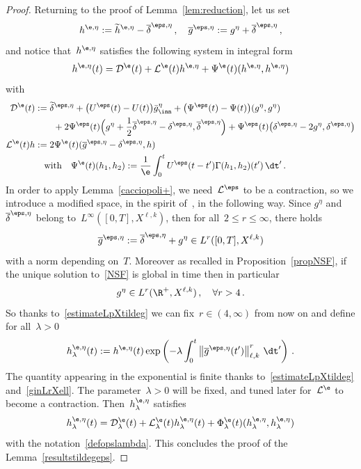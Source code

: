 \begin{proof}
Returning to the proof of Lemma~\ref{lem:reduction}, let us set
\[
h^{\e,\eta} := \widetilde h^{\e,\eta} - \overline\delta^{\eps,\eta} \,, \quad \overline g^{\eps,\eta}:= g^{ \eta} +\overline \delta^{\eps,\eta}\,,
\]
and notice that~$ h^{\e,\eta}$ satisfies the following system in integral form
\begin{equation}\label{integralformheps}
h^{\e,\eta}(t) = \mathcal{D}^{\e}(t) + \mathcal{L}^{\e}(t) h^{\e,\eta}+ \Psi^\e(t) (h^{\e,\eta}, h^{\e,\eta})
\end{equation}
with
\[
\begin{aligned}
\mathcal{D}^\e (t) & := \widetilde \delta^{\eps,\eta} + \big(U^\eps (t) - U (t)\big)\bar g^\eta_{\inn} + \big(\Psi^\eps (t) - \Psi(t) \big) (g^\eta,g^\eta)
\\
& \qquad + 2 \Psi^\eps (t) \Big({g^\eta+\frac 12 \overline\delta^{\eps,\eta}}- \delta^{\eps,\eta}, \overline\delta^{\eps,\eta}\Big) +\Psi^\eps (t)
\big(\delta^{\eps,\eta} -2g^\eta, \delta^{\eps,\eta} \big) \\
\mathcal{L}^\e (t) h& := 2\Psi ^{\e}(t) (\overline g^{\eps,\eta}- \delta^{\eps,\eta},h) \\
&\quad\text{with} \quad
\Psi ^{\e }(t) (h_1,h_2) :=\frac1\e
\int_0^t U^\eps(t-t')\Gamma (h_1,h_2) (t')\, \dt' \,.
\end{aligned}
\]
In order to apply Lemma~\ref{cacciopoli+}, we need~$\mathcal{L}^{\eps}$ to be a contraction, so we introduce a modified space, in the spirit of~\cite{cg}, in the following way. Since $ g^\eta$ and~$\overline\delta^{\eps,\eta}$ belong to~$L^\infty([0,T],X^{\ell,k})$, then for all~$2\leq r \leq\infty$, there holds
\begin{equation}\label{ginLrXellT}
\overline g^{\eps,\eta}:= \overline\delta^{\eps,\eta} +g^\eta\in L^r([0,T],X^{\ell,k})
\end{equation}
with a norm depending on~$T$. Moreover as recalled in Proposition~\ref{propNSF}, if the unique solution to~\eqref{NSF} is global in time then in particular
\begin{equation}\label{ginLrXell}
g^\eta \in L^r(\R^+,X^{\ell,k}) \,, \quad \forall r>4\,.
\end{equation}
So thanks to~\eqref{estimateLpXtildeg} we can fix~$r \in (4,\infty)$ from now on and define for all~$\lambda> 0$
\[
h^{\e,\eta}_\lambda (t):=h^{\e,\eta}(t) \exp \left(-\lambda \int_0^t \left\|\overline g^{\eps,\eta}(t')\right\|_{\ell,k}^r\, \dt'
\right)\,.
\]
The quantity appearing in the exponential is finite thanks to~\eqref{estimateLpXtildeg} and~\eqref{ginLrXell}. The parameter~$\lambda>0$ will be fixed, and tuned later for~$ \mathcal{L}^{\e}$ to become a contraction. Then~$h^{\e,\eta}_\lambda$ satisfies
\[
h^{\e,\eta}_\lambda(t) = \mathcal{D}_\lambda^{\e}(t) + \mathcal{L}_\lambda^{\e}(t) h^{\e,\eta}_\lambda(t) + \Phi^{\e}_\lambda(t) (h^{\e,\eta}_\lambda,h^{\e,\eta}_\lambda)
\]
with the notation~\eqref{defopslambda}. This concludes the proof of the Lemma~\ref{resultstildegeps}.
\end{proof}

